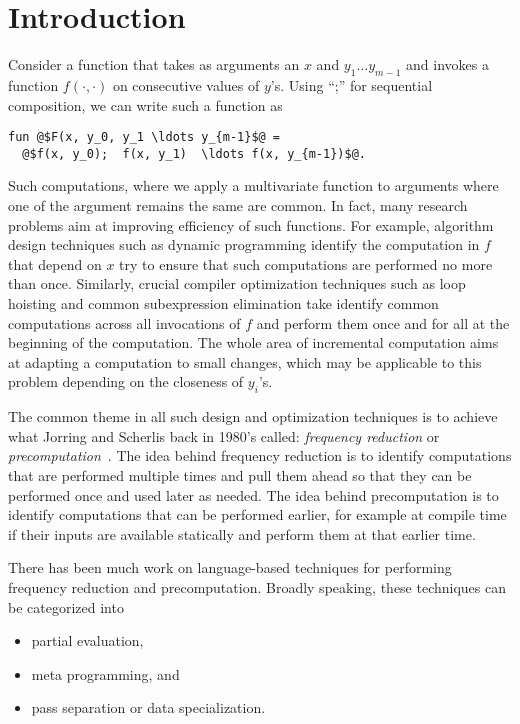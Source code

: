 \newcommand{\langname}{LAMDA12\xspace}
\section{Introduction}

Consider a function that takes as arguments an $x$ and $y_1 \ldots
y_{m-1}$ and invokes a function $f(\cdot, \cdot)$ on consecutive
values of $y$'s.  Using ``;'' for  sequential composition, we can
write such a function as
\begin{lstlisting}
fun @$F(x, y_0, y_1 \ldots y_{m-1}$@ = 
  @$f(x, y_0);  f(x, y_1)  \ldots f(x, y_{m-1})$@.
\end{lstlisting}
%

Such computations, where we apply a multivariate function to arguments
where one of the argument remains the same are common.  In fact, many
research problems aim at improving efficiency of such functions.  For
example, algorithm design techniques such as dynamic programming
identify the computation in $f$ that depend on $x$ try to ensure that
such computations are performed no more than once.  Similarly, crucial
compiler optimization techniques such as loop hoisting and common
subexpression elimination take identify common computations across all
invocations of $f$ and perform them once and for all at the beginning
of the computation. The whole area of incremental computation aims at
adapting a computation to small changes, which may be applicable to
this problem depending on the closeness of $y_i$'s.

The common theme in all such design and optimization techniques is to
achieve what Jorring and Scherlis back in 1980's called: {\em
  frequency reduction} or {\em precomputation}~\cite{JS86-staging}.
The idea behind frequency reduction is to identify computations that
are performed multiple times and pull them ahead so that they can be
performed once and used later as needed.  The idea behind
precomputation is to identify computations that can be performed
earlier, for example at compile time if their inputs are available
statically and perform them at that earlier time. 


There has been much work on language-based techniques for performing
frequency reduction and precomputation.  Broadly speaking, these
techniques can be categorized into
\begin{itemize}
\item 
partial evaluation,

\item
meta programming, and

\item 
pass separation or data specialization.

\end{itemize}

